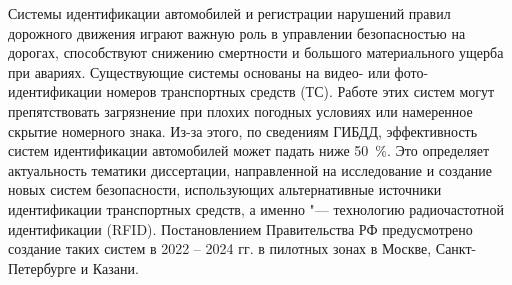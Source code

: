 




{\actuality} Системы идентификации автомобилей и регистрации нарушений правил дорожного движения играют важную роль в управлении безопасностью на дорогах, способствуют снижению смертности и большого материального ущерба при авариях. Существующие системы основаны на видео- или фото-идентификации номеров транспортных средств (ТС). Работе этих систем могут препятствовать загрязнение при плохих погодных условиях или намеренное скрытие номерного знака. Из-за этого, по сведениям ГИБДД, эффективность систем идентификации автомобилей может падать ниже 50~\%. Это определяет актуальность тематики диссертации, направленной на исследование и создание новых систем безопасности, использующих альтернативные источники идентификации транспортных средств, а именно "--- технологию радиочастотной идентификации (RFID). Постановлением Правительства РФ предусмотрено создание таких систем в 2022 -- 2024 гг. в пилотных зонах в Москве, Санкт-Петербурге и Казани.

